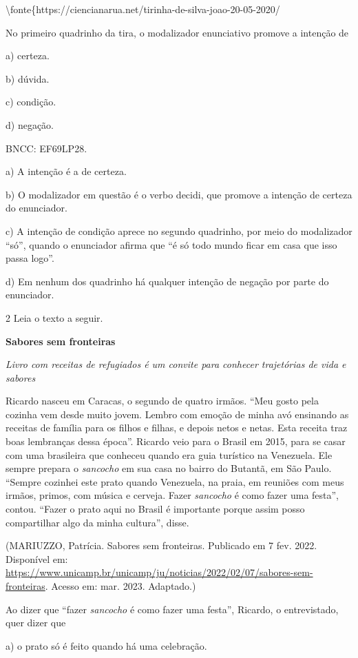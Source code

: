 {\textbackslash fonte\{https://ciencianarua.net/tirinha-de-silva-joao-20-05-2020/

No primeiro quadrinho da tira, o modalizador enunciativo promove a
intenção de

a) certeza.

b) dúvida.

c) condição.

d) negação.

BNCC: EF69LP28.

a) A intenção é a de certeza.

b) O modalizador em questão é o verbo decidi, que promove a intenção de
certeza do enunciador.

c) A intenção de condição aprece no segundo quadrinho, por meio do
modalizador ``só'', quando o enunciador afirma que ``é só todo mundo
ficar em casa que isso passa logo''.

d) Em nenhum dos quadrinho há qualquer intenção de negação por parte do
enunciador.

\num{2} Leia o texto a seguir.

\textbf{Sabores sem fronteiras}

\emph{Livro com receitas de refugiados é um convite para conhecer
trajetórias de vida e sabores}

Ricardo nasceu em Caracas, o segundo de quatro irmãos. ``Meu gosto pela
cozinha vem desde muito jovem. Lembro com emoção de minha avó ensinando
as receitas de família para os filhos e filhas, e depois netos e netas.
Esta receita traz boas lembranças dessa época''. Ricardo veio para o
Brasil em 2015, para se casar com uma brasileira que conheceu quando era
guia turístico na Venezuela. Ele sempre prepara o \emph{sancocho} em sua
casa no bairro do Butantã, em São Paulo. ``Sempre cozinhei este prato
quando Venezuela, na praia, em reuniões com meus irmãos, primos, com
música e cerveja. Fazer \emph{sancocho} é como fazer uma festa'',
contou. ``Fazer o prato aqui no Brasil é importante porque assim posso
compartilhar algo da minha cultura'', disse.

(MARIUZZO, Patrícia. Sabores sem fronteiras. Publicado em 7 fev. 2022.
Disponível em:
\url{https://www.unicamp.br/unicamp/ju/noticias/2022/02/07/sabores-sem-fronteiras}.
Acesso em: mar. 2023. Adaptado.)

Ao dizer que ``fazer \emph{sancocho} é como fazer uma festa'', Ricardo,
o entrevistado, quer dizer que

a) o prato só é feito quando há uma celebração.

}
